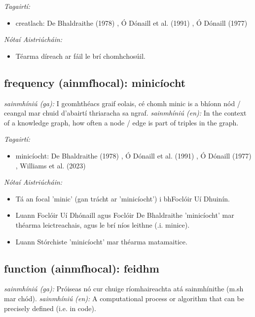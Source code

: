 \documentclass{article}
\begin{document}
 \noindent \textit{Tagairtí:}
\begin{itemize}
	\item creatlach: De Bhaldraithe (1978) \cite{de-bhaldraithe}, Ó Dónaill et al. (1991) \cite{focloir-beag}, Ó Dónaill (1977) \cite{odonaill}
\end{itemize}

 \noindent \textit{Nótaí Aistriúcháin:}
\begin{itemize}
	\item Téarma díreach ar fáil le brí chomhchosúil.
\end{itemize}


\subsection*{frequency (ainmfhocal): minicíocht} 
 \noindent \textit{sainmhíniú (ga):} I gcomhthéacs graif eolais, cé chomh minic is a bhíonn nód / ceangal mar chuid d'abairtí thriaracha sa ngraf.
\newline\newline
 \noindent \textit{sainmhíniú (en):} In the context of a knowledge graph, how often a node / edge is part of triples in the graph.
\newline

 \noindent \textit{Tagairtí:}
\begin{itemize}
	\item minicíocht: De Bhaldraithe (1978) \cite{de-bhaldraithe}, Ó Dónaill et al. (1991) \cite{focloir-beag}, Ó Dónaill (1977) \cite{odonaill}, Williams et al. (2023) \cite{storchiste}
\end{itemize}

 \noindent \textit{Nótaí Aistriúcháin:}
\begin{itemize}
	\item Tá an focal 'minic' (gan trácht ar 'minicíocht') i bhFoclóir Uí Dhuinín.
	\item Luann Foclóir Uí Dhónaill agus Foclóir De Bhaldraithe 'minicíocht' mar théarma leictreachais, agus le brí níos leithne (.i. minice).
	\item Luann Stórchiste 'minicíocht' mar théarma matamaitice.
\end{itemize}


\subsection*{function (ainmfhocal): feidhm} 
 \noindent \textit{sainmhíniú (ga):} Próiseas nó cur chuige ríomhaireachta atá sainmhínithe (m.sh mar chód).
\newline\newline
 \noindent \textit{sainmhíniú (en):} A computational process or algorithm that can be precisely defined (i.e. in code).
\newline
\end{document}
